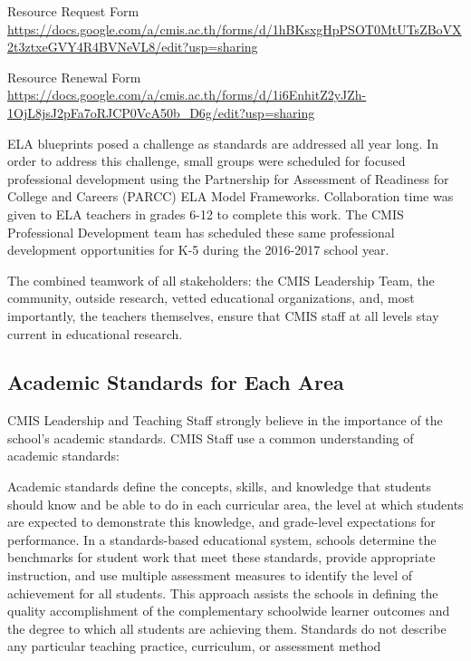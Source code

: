 \documentclass{report}
\begin{document}
\begin{evidence}
\item Resource Request Form \url{https://docs.google.com/a/cmis.ac.th/forms/d/1hBKsxgHpPSOT0MtUTsZBoVX2t3ztxeGVY4R4BVNeVL8/edit?usp=sharing}
\item Resource Renewal Form \url{https://docs.google.com/a/cmis.ac.th/forms/d/1i6EnhitZ2yJZh-1OjL8jsJ2pFa7oRJCP0VcA50b_D6g/edit?usp=sharing}
\end{evidence}

\begin{findings}
ELA blueprints posed a challenge as standards are addressed all year long. In order to address this challenge, small groups were scheduled for focused professional development using the Partnership for Assessment of Readiness for College and Careers (PARCC) ELA Model Frameworks. Collaboration time was given to ELA teachers in grades 6-12 to complete this work. The CMIS Professional Development team has scheduled these same professional development opportunities for K-5 during the 2016-2017 school year. 

The combined teamwork of all stakeholders: the CMIS Leadership Team, the community, outside research, vetted educational organizations, and, most importantly,  the teachers themselves, ensure that CMIS staff at all levels stay current in educational research.
\end{findings}

\subsection{Academic Standards for Each Area}



\begin{findings}
CMIS Leadership and Teaching Staff strongly believe in the importance of the school’s academic standards. CMIS Staff use a common understanding of academic standards: 

Academic standards define the concepts, skills, and knowledge that students should know and be able to do in each curricular area, the level at which students are expected to demonstrate this knowledge, and grade-level expectations for performance. In a standards-based educational system, schools determine the benchmarks for student work that meet these standards, provide appropriate instruction, and use multiple assessment measures to identify the level of achievement for all students. This approach assists the schools in defining the quality accomplishment of the complementary schoolwide learner outcomes and the degree to which all students are achieving them. Standards do not describe any particular teaching practice, curriculum, or assessment method 
\end{findings}
\end{document}
